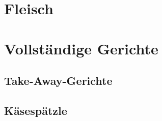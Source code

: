 \documentclass[a4paper, 12pt]{scrbook} 								%
\numberwithin{equation}{section} 									%
\begin{document}

\chapter{Fleisch}


\chapter{Vollständige Gerichte}
\newpage

	\section{Take-Away-Gerichte}
	\newpage

	\section{Käsespätzle}

	\noindent
\end{document}
